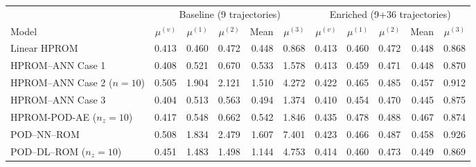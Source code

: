 \begin{tabular}{lrrrrr|rrrrr}
\toprule
& \multicolumn{5}{c|}{Baseline (9 trajectories)} & \multicolumn{5}{c}{Enriched (9+36 trajectories)} \\
Model & $\mu^{(v)}$ & $\mu^{(1)}$ & $\mu^{(2)}$ & Mean & $\mu^{(3)}$ & $\mu^{(v)}$ & $\mu^{(1)}$ & $\mu^{(2)}$ & Mean & $\mu^{(3)}$ \\
\midrule
Linear HPROM & 0.413 & 0.460 & 0.472 & 0.448 & 0.868 & 0.413 & 0.460 & 0.472 & 0.448 & 0.868 \\
HPROM--ANN Case 1 & 0.408 & 0.521 & 0.670 & 0.533 & 1.578 & 0.413 & 0.459 & 0.471 & 0.448 & 0.870 \\
HPROM--ANN Case 2 ($n=10$) & 0.505 & 1.904 & 2.121 & 1.510 & 4.272 & 0.422 & 0.465 & 0.485 & 0.457 & 0.912 \\
HPROM--ANN Case 3 & 0.404 & 0.513 & 0.563 & 0.494 & 1.374 & 0.410 & 0.454 & 0.470 & 0.445 & 0.875 \\
HPROM-POD-AE ($n_z=10$) & 0.417 & 0.548 & 0.662 & 0.542 & 1.846 & 0.435 & 0.478 & 0.488 & 0.467 & 0.874 \\
\midrule
POD--NN--ROM & 0.508 & 1.834 & 2.479 & 1.607 & 7.401 & 0.423 & 0.466 & 0.487 & 0.458 & 0.926 \\
POD--DL--ROM ($n_z=10$) & 0.451 & 1.483 & 1.498 & 1.144 & 4.753 & 0.414 & 0.460 & 0.473 & 0.449 & 0.869 \\
\bottomrule
\end{tabular}
